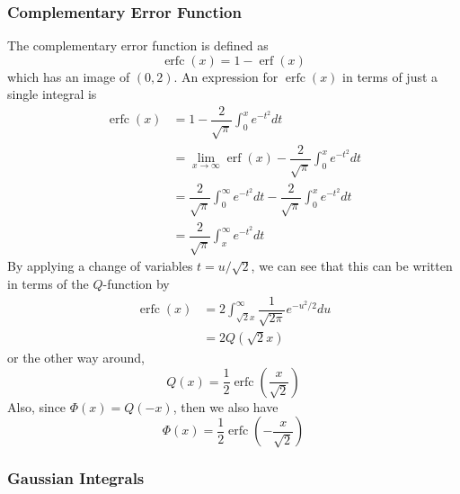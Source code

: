 \documentclass[11pt]{report} %
\begin{document}
\subsubsection{Complementary Error Function}

The complementary error function is defined as
\begin{equation}
\operatorname{erfc}\left(x\right) = 1 - \operatorname{erf}\left(x\right)
\end{equation}
which has an image of $\left(0, 2\right)$. An expression for $\operatorname{erfc}\left(x\right)$ in terms of just a single integral is
\begin{align}
\operatorname{erfc}\left(x\right) &= 1-\dfrac{2}{\sqrt{\pi}}\int_{0}^{x}e^{-t^{2}}dt \\
&= \lim_{x\to\infty}\operatorname{erf}\left(x\right)-\dfrac{2}{\sqrt{\pi}}\int_{0}^{x}e^{-t^{2}}dt \\
&= \dfrac{2}{\sqrt{\pi}}\int_{0}^{\infty}e^{-t^{2}}dt-\dfrac{2}{\sqrt{\pi}}\int_{0}^{x}e^{-t^{2}}dt \\
&= \dfrac{2}{\sqrt{\pi}}\int_{x}^{\infty}e^{-t^{2}}dt
\end{align}
By applying a change of variables $t = u/\sqrt{2}$, we can see that this can be written in terms of the $Q$-function by
\begin{align}
\operatorname{erfc}\left(x\right) &= 2\int_{\sqrt{2}x}^{\infty}\dfrac{1}{\sqrt{2\pi}}e^{-u^{2}/2}du \\
&= 2Q\left(\sqrt{2}x\right)
\end{align}
or the other way around,
\begin{equation}
Q\left(x\right) = \dfrac{1}{2}\operatorname{erfc}\left(\dfrac{x}{\sqrt{2}}\right)
\end{equation}
Also, since $\Phi\left(x\right) = Q\left(-x\right)$, then we also have
\begin{equation}
\Phi\left(x\right) = \dfrac{1}{2}\operatorname{erfc}\left(-\dfrac{x}{\sqrt{2}}\right)
\end{equation}

\subsubsection{Gaussian Integrals}
\end{document}

